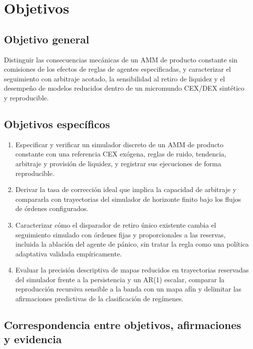 \chapter{Objetivos}
\label{cap:objetivos}

\section{Objetivo general}

Distinguir las consecuencias mecánicas de un AMM de producto constante sin comisiones de los efectos de reglas de agentes especificadas, y caracterizar el seguimiento con arbitraje acotado, la sensibilidad al retiro de liquidez y el desempeño de modelos reducidos dentro de un micromundo CEX/DEX sintético y reproducible.

\section{Objetivos específicos}

\begin{enumerate}[label=\textbf{OE\arabic*.}, leftmargin=3em]
  \item Especificar y verificar un simulador discreto de un AMM de producto constante con una referencia CEX exógena, reglas de ruido, tendencia, arbitraje y provisión de liquidez, y registrar sus ejecuciones de forma reproducible.
  \item Derivar la tasa de corrección ideal que implica la capacidad de arbitraje y compararla con trayectorias del simulador de horizonte finito bajo los flujos de órdenes configurados.
  \item Caracterizar cómo el disparador de retiro único existente cambia el seguimiento simulado con órdenes fijas y proporcionales a las reservas, incluida la ablación del agente de pánico, sin tratar la regla como una política adaptativa validada empíricamente.
  \item Evaluar la precisión descriptiva de mapas reducidos en trayectorias reservadas del simulador frente a la persistencia y un AR(1) escalar, comparar la reproducción recursiva sensible a la banda con un mapa afín y delimitar las afirmaciones predictivas de la clasificación de regímenes.
\end{enumerate}

\section{Correspondencia entre objetivos, afirmaciones y evidencia}

